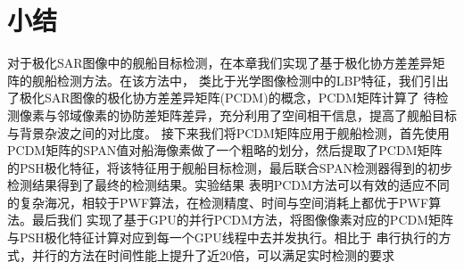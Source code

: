 \section{小结}
    对于极化SAR图像中的舰船目标检测，在本章我们实现了基于极化协方差差异矩阵的舰船检测方法。在该方法中，
    类比于光学图像检测中的LBP特征，我们引出了极化SAR图像的极化协方差差异矩阵(PCDM)的概念，PCDM矩阵计算了
    待检测像素与邻域像素的协防差矩阵差异，充分利用了空间相干信息，提高了舰船目标与背景杂波之间的对比度。
    接下来我们将PCDM矩阵应用于舰船检测，首先使用PCDM矩阵的SPAN值对船海像素做了一个粗略的划分，然后提取了PCDM矩阵
    的PSH极化特征，将该特征用于舰船目标检测，最后联合SPAN检测器得到的初步检测结果得到了最终的检测结果。实验结果
    表明PCDM方法可以有效的适应不同的复杂海况，相较于PWF算法，在检测精度、时间与空间消耗上都优于PWF算法。最后我们
    实现了基于GPU的并行PCDM方法，将图像像素对应的PCDM矩阵与PSH极化特征计算对应到每一个GPU线程中去并发执行。相比于
    串行执行的方式，并行的方法在时间性能上提升了近20倍，可以满足实时检测的要求


